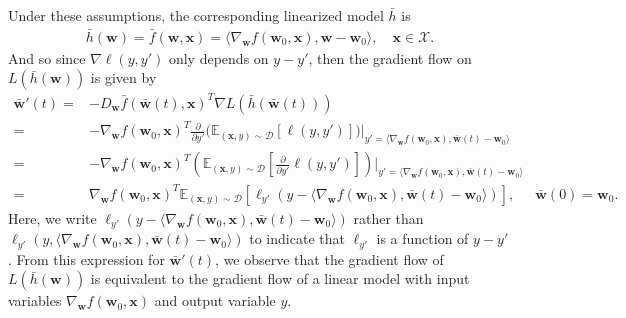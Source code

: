 \documentclass{article}
\begin{document}
Under these assumptions, the corresponding linearized model $\bar{h}$ is
\begin{align*}
    \bar{h}(\boldsymbol{w}) = \bar{f}(\boldsymbol{w}, \boldsymbol{x}) = \langle \nabla_{\boldsymbol{w}} f(\boldsymbol{w}_0, \boldsymbol{x}), \boldsymbol{w}-\boldsymbol{w}_0\rangle, \quad \boldsymbol{x} \in \mathcal{X}. 
\end{align*}
And so since $\nabla \ell(y, y')$ only depends on $y - y'$, then the gradient flow on $L(\bar{h}(\boldsymbol{w}))$ is given by
\begin{align*}
    \boldsymbol{\bar{w}}'(t) =& - D_{\boldsymbol{w}}\bar{f}(\boldsymbol{\bar{w}}(t), \boldsymbol{x})^T \nabla L(\bar{h}(\boldsymbol{\bar{w}}(t)))\\
    =& -\nabla_{\boldsymbol{w}}f(\boldsymbol{w}_0, \boldsymbol{x})^T
    \frac{\partial}{\partial y'} \bigg( \mathbb{E}_{(\boldsymbol{x}, y) \sim \mathcal{D}} \left[\ell(y, y') \right] \bigg)\bigg|_{y' = \langle \nabla_{\boldsymbol{w}} f(\boldsymbol{w}_0, \boldsymbol{x}), \boldsymbol{\bar{w}}(t)-\boldsymbol{w}_0\rangle}\\
    =& -\nabla_{\boldsymbol{w}}f(\boldsymbol{w}_0, \boldsymbol{x})^T \left(\mathbb{E}_{(\boldsymbol{x}, y) \sim \mathcal{D}} \left[ \frac{\partial}{\partial y'}\ell(y, y') \right] \right)\bigg|_{y' = \langle \nabla_{\boldsymbol{w}} f(\boldsymbol{w}_0, \boldsymbol{x}), \boldsymbol{\bar{w}}(t)-\boldsymbol{w}_0\rangle}\\
    =& \nabla_{\boldsymbol{w}}f(\boldsymbol{w}_0, \boldsymbol{x})^T \mathbb{E}_{(\boldsymbol{x}, y) \sim \mathcal{D}} \left[ \ell_{y'}(y - \langle \nabla_{\boldsymbol{w}} f(\boldsymbol{w}_0, \boldsymbol{x}), \boldsymbol{\bar{w}}(t)-\boldsymbol{w}_0\rangle) \right],
    & \boldsymbol{\bar{w}}(0) = \boldsymbol{w}_0.
\end{align*}
Here, we write $\ell_{y'}(y - \langle \nabla_{\boldsymbol{w}} f(\boldsymbol{w}_0, \boldsymbol{x}), \boldsymbol{\bar{w}}(t)-\boldsymbol{w}_0\rangle)$ rather than $\ell_{y'}(y, \langle \nabla_{\boldsymbol{w}} f(\boldsymbol{w}_0, \boldsymbol{x}), \boldsymbol{\bar{w}}(t)-\boldsymbol{w}_0\rangle)$ to indicate that $\ell_{y'}$ is a function of $y - y'$. From this expression for $\boldsymbol{\bar{w}}'(t)$, we observe that the gradient flow of $L(\bar{h}(\boldsymbol{w}))$ is equivalent to the gradient flow of a linear model with input variables $\nabla_{\boldsymbol{w}} f(\boldsymbol{w}_0, \boldsymbol{x})$ and output variable $y$. 
\end{document}
